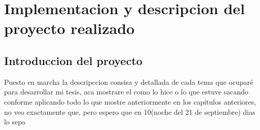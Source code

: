 
\chapter{Implementacion y descripcion del proyecto realizado} %
\label{Chapter4}


\section{Introduccion del proyecto}

Puesto en marcha la descripccion consisa y detallada de cada tema que ocupar\'e para desarrollar mi tesis, aca mostrare el como lo hice o lo que estuve sacando conforme  aplicando todo lo  que mostre anteriormente en los capitulos anteriores, no veo exactamente que, pero  espero que en 10(noche del 21 de septiembre) dias lo sepa

